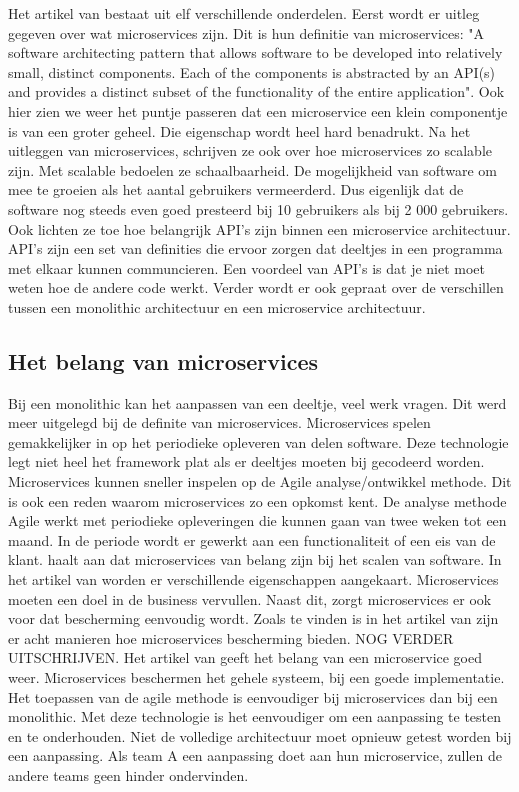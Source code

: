 Het artikel van \textcite{series2018} bestaat uit elf verschillende onderdelen. Eerst wordt er uitleg gegeven over wat microservices zijn. Dit is hun definitie van microservices: "A software architecting pattern that allows software to be developed into relatively small, distinct components. Each of the components is abstracted by an API(s) and provides a distinct subset of the functionality of the entire application". Ook hier zien we weer het puntje passeren dat een microservice een klein componentje is van een groter geheel. Die eigenschap wordt heel hard benadrukt. Na het uitleggen van microservices, schrijven ze ook over hoe microservices zo scalable zijn. Met scalable bedoelen ze schaalbaarheid. De mogelijkheid van software om mee te groeien als het aantal gebruikers vermeerderd. Dus eigenlijk dat de software nog steeds even goed presteerd bij 10 gebruikers als bij 2 000 gebruikers. Ook lichten ze toe hoe belangrijk API's zijn binnen een microservice architectuur. API's zijn een set van definities die ervoor zorgen dat deeltjes in een programma met elkaar kunnen communcieren. Een voordeel van API's is dat je niet moet weten hoe de andere code werkt. Verder wordt er ook gepraat over de verschillen tussen een monolithic architectuur en een microservice architectuur. 
\subsection{Het belang van microservices}
Bij een monolithic kan het aanpassen van een deeltje, veel werk vragen. Dit werd meer uitgelegd bij de definite van microservices. Microservices spelen gemakkelijker in op het periodieke opleveren van delen software. Deze technologie legt niet heel het framework plat als er deeltjes moeten bij gecodeerd worden. Microservices kunnen sneller inspelen op de Agile analyse/ontwikkel methode. Dit is ook een reden waarom microservices zo een opkomst kent. De analyse methode Agile werkt met periodieke opleveringen die kunnen gaan van twee weken tot een maand. In de periode wordt er gewerkt aan een functionaliteit of een eis van de klant. 
\textcite{series2018} haalt aan dat microservices van belang zijn bij het scalen van software.
In het artikel van \textcite{RDX2016} worden er verschillende eigenschappen aangekaart. Microservices moeten een doel in de business vervullen. Naast dit, zorgt microservices er ook voor dat bescherming eenvoudig wordt. 
Zoals te vinden is in het artikel van \textcite{Troisi2019} zijn er acht manieren hoe microservices bescherming bieden. NOG VERDER UITSCHRIJVEN.
Het artikel van \textcite{Watts2018} geeft het belang van een microservice goed weer. Microservices beschermen het gehele systeem, bij een goede implementatie. Het toepassen van de agile methode is eenvoudiger bij microservices dan bij een monolithic. Met deze technologie is het eenvoudiger om een aanpassing te testen en te onderhouden. Niet de volledige architectuur moet opnieuw getest worden bij een aanpassing. Als team A een aanpassing doet aan hun microservice, zullen de andere teams geen hinder ondervinden. 
